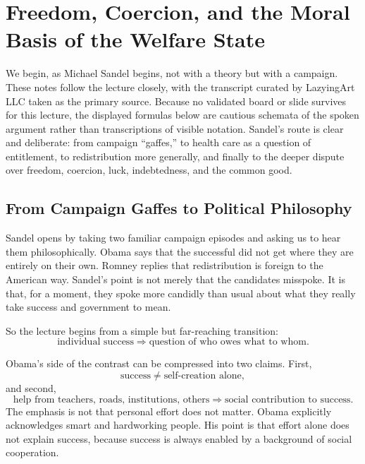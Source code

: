 \chapter{Freedom, Coercion, and the Moral Basis of the Welfare State}

We begin, as Michael Sandel begins, not with a theory but with a campaign. These notes follow the lecture closely, with the transcript curated by LazyingArt LLC taken as the primary source. Because no validated board or slide survives for this lecture, the displayed formulas below are cautious schemata of the spoken argument rather than transcriptions of visible notation. Sandel's route is clear and deliberate: from campaign ``gaffes,'' to health care as a question of entitlement, to redistribution more generally, and finally to the deeper dispute over freedom, coercion, luck, indebtedness, and the common good.

\section{From Campaign Gaffes to Political Philosophy}

Sandel opens by taking two familiar campaign episodes and asking us to hear them philosophically. Obama says that the successful did not get where they are entirely on their own. Romney replies that redistribution is foreign to the American way. Sandel's point is not merely that the candidates misspoke. It is that, for a moment, they spoke more candidly than usual about what they really take success and government to mean.

So the lecture begins from a simple but far-reaching transition:
\begin{equation}
\text{individual success}
\Longrightarrow
\text{question of who owes what to whom}.
\end{equation}

Obama's side of the contrast can be compressed into two claims. First,
\begin{equation}
\text{success}
\neq
\text{self-creation alone},
\end{equation}
and second,
\begin{equation}
\text{help from teachers, roads, institutions, others}
\Longrightarrow
\text{social contribution to success}.
\end{equation}
The emphasis is not that personal effort does not matter. Obama explicitly acknowledges smart and hardworking people. His point is that effort alone does not explain success, because success is always enabled by a background of social cooperation.

